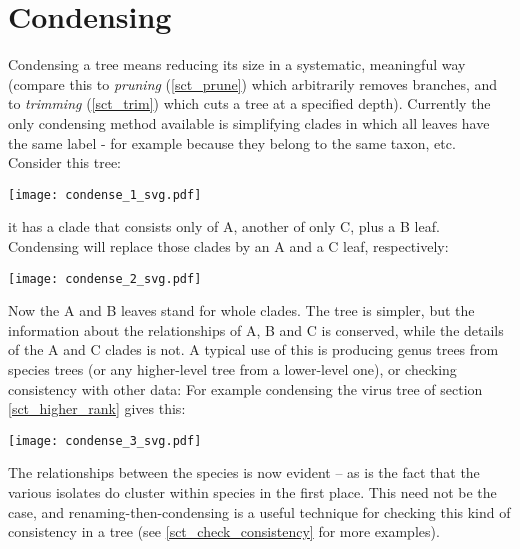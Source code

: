 \section{Condensing}
\label{sct_condense}

Condensing a tree means reducing its size in a systematic, meaningful way
(compare this to \emph{pruning} (\ref{sct_prune}) which arbitrarily removes
branches, and to \textit{trimming} (\ref{sct_trim}) which cuts a tree at a
specified depth). Currently the only condensing method available is
simplifying clades in which all leaves have the same label - for example
because they belong to the same taxon, etc. Consider this tree:

\begin{center}
\texttt{[image: condense\_1\_svg.pdf]}
\end{center}

\noindent{}it has a clade that consists only of A, another of only C, plus a B
leaf.  Condensing will replace those clades by an A and a C leaf,
respectively:


\begin{center}
\texttt{[image: condense\_2\_svg.pdf]}
\end{center}

\noindent{}Now the A and B leaves stand for whole clades. The tree is simpler,
but the information about the relationships of A, B and C is conserved, while
the details of the A and C clades is not.  A typical use of this is producing
genus trees from species trees (or any higher-level tree from a lower-level
one), or checking consistency with other data: For example condensing the virus
tree of section \ref{sct_higher_rank} gives this:

\begin{center}
\texttt{[image: condense\_3\_svg.pdf]}
\end{center}

\noindent{}The relationships between the species is now evident -- as is the
fact that the various isolates do cluster within species in the first place.
This need not be the case, and renaming-then-condensing is a useful technique
for checking this kind of consistency in a tree (see
\ref{sct_check_consistency} for more examples).
